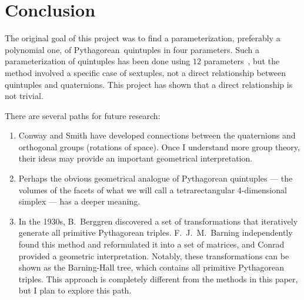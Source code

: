\documentclass[12pt]{article}
\theoremstyle{definition}
\theoremstyle{remark}
\numberwithin{equation}{section}
\begin{document}
\section{Conclusion}



The original
goal of this project was to find a parameterization, preferably a polynomial one,  of 
Pythagorean~quintuples in four parameters.
Such a parameterization of quintuples
has been done using $12$ parameters~\cite{Polynomial_parametrization},
but the method involved a
specific case of sextuples, not a direct relationship between 
quintuples and quaternions. 
This project has shown that a
direct relationship is not trivial.



There are several paths
 for future research:
\begin{enumerate}


%


\item
{Conway and Smith have developed connections between the
 quaternions and 
orthogonal groups (rotations of space). 
Once I understand
 more group theory, their ideas may provide an important
 geometrical interpretation. 
}


\item
{ Perhaps the obvious geometrical analogue of Pythagorean quintuples
  --- the volumes of the facets of what we will call a
  tetrarectangular 4-dimensional simplex --- has a deeper meaning.  }



\item

{In the 1930s, B.\ Berggren \cite{Swedish_Tree} discovered a set of
transformations that iteratively generate all primitive Pythagorean
triples.  F.\ J.\ M.\ Barning \cite{Dutch_Tree} independently found
this method and reformulated it into a set of matrices, and Conrad 
\cite{Conrad} provided a geometric interpretation.  Notably,
these transformations can be shown as the Barning-Hall tree, which
contains all primitive Pythagorean triples.  This approach is 
completely different from the methods in this paper, but
I plan to explore this path.}


\end{enumerate}
\end{document}
